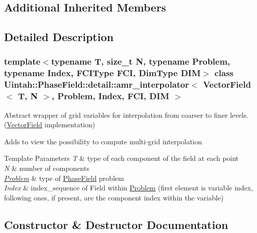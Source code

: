 \subsection*{Additional Inherited Members}


\subsection{Detailed Description}
\subsubsection*{template$<$typename T, size\+\_\+t N, typename Problem, typename Index, F\+C\+I\+Type F\+CI, Dim\+Type D\+IM$>$\newline
class Uintah\+::\+Phase\+Field\+::detail\+::amr\+\_\+interpolator$<$ Vector\+Field$<$ T, N $>$, Problem, Index, F\+C\+I, D\+I\+M $>$}

Abstract wrapper of grid variables for interpolation from coarser to finer levels. (\hyperlink{structUintah_1_1PhaseField_1_1VectorField}{Vector\+Field} implementation) 

Adds to view the possibility to compute multi-\/grid interpolation


\begin{DoxyTemplParams}{Template Parameters}
{\em T} & type of each component of the field at each point \\
\hline
{\em N} & number of components \\
\hline
{\em \hyperlink{classUintah_1_1PhaseField_1_1Problem}{Problem}} & type of \hyperlink{namespaceUintah_1_1PhaseField}{Phase\+Field} problem \\
\hline
{\em Index} & index\+\_\+sequence of Field within \hyperlink{classUintah_1_1PhaseField_1_1Problem}{Problem} (first element is variable index, following ones, if present, are the component index within the variable) \\
\hline
\end{DoxyTemplParams}


\subsection{Constructor \& Destructor Documentation}
\mbox{\label{classUintah_1_1PhaseField_1_1detail_1_1amr__interpolator_3_01VectorField_3_01T_00_01N_01_4_00_01ab3739ebd28e1ffb5bc0b138cfaddd80_affa96f42d4c838acc9a94dd0c5fc4d33}} 
